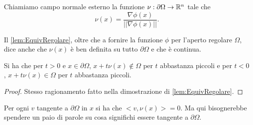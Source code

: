 \begin{definition}
	Chiamiamo campo normale esterno la funzione $\nu:\partial\Omega\rightarrow \mathbb R^n$ tale che
	\[
		\nu(x)=\frac{\nabla \phi(x)}{||\nabla \phi(x)||}.
	\]
\end{definition}

\begin{remark}
	Il \cref{lem:EquivRegolare}, oltre che a fornire la funzione $\phi$ per l'aperto regolare $\Omega$, dice anche che $\nu(x)$ è ben definita
	su tutto $\partial \Omega$ e che è continua.
\end{remark}

\begin{remark}
	Si ha che per $t>0$ e $x\in\partial\Omega$, $x+t\nu(x)\notin \Omega$ per $t$ abbastanza piccoli e per $t<0$, $x+t\nu(x)\in \Omega$ per $t$
	abbastanza piccoli.
\end{remark}
\begin{proof}
	Stesso ragionamento fatto nella dimostrazione di \cref{lem:EquivRegolare}.
\end{proof}

\begin{remark}
	Per ogni $v$ tangente a $\partial\Omega$ in $x$ si ha che $<v,\nu(x)>=0$. Ma qui bisognerebbe spendere un paio di parole su cosa significhi
	essere tangente a $\partial\Omega$.
\end{remark}
